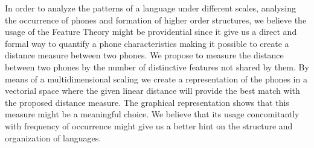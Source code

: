 In order to analyze the patterns of a language under different scales, analysing
the occurrence of phones and formation of higher order structures, we believe
the usage of the Feature Theory might be providential since it give us a
direct and formal way to quantify a phone characteristics making it possible
to create a distance measure between two phones. We propose to measure the 
distance between two phones by the number of distinctive features not shared 
by them. By means of a multidimensional scaling we create a representation
of the phones in a vectorial space where the given linear distance will
provide the best match with the proposed distance measure. 
The graphical representation shows that this measure might be a meaningful choice.
We believe that its usage concomitantly with frequency of occurrence might
give us a better hint on the structure and organization of languages.




